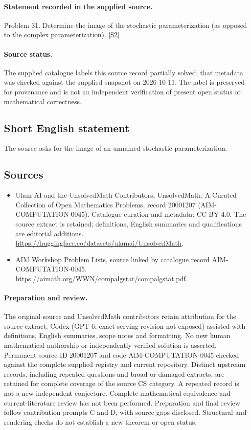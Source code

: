 \documentclass[11pt]{article}
\newcommand{\sref}[2]{\hyperlink{source:#1:#2}{[S#2]}}
\begin{document}
\paragraph{Statement recorded in the supplied source.}
Problem 31. Determine the image of the stochastic parameterization (as opposed to the complex parameterization). \sref{20001207}{2}
\paragraph{Source status.}
The supplied catalogue labels this source record partially solved; that metadata was checked against the supplied snapshot on 2026-10-11. The label is preserved for provenance and is not an independent verification of present open status or mathematical correctness.
\subsection{Short English statement}
The source asks for the image of an unnamed stochastic parameterization.
\subsection{Sources}
\begin{itemize}
\item[\hypertarget{source:20001207:1}{S1}] Ulam AI and the UnsolvedMath Contributors, UnsolvedMath: A Curated Collection of Open Mathematics Problems, record 20001207 (AIM-COMPUTATION-0045). Catalogue curation and metadata: CC BY 4.0. The source extract is retained; definitions, English summaries and qualifications are editorial additions.
\url{https://huggingface.co/datasets/ulamai/UnsolvedMath}.
\item[\hypertarget{source:20001207:2}{S2}] AIM Workshop Problem Lists, source linked by catalogue record AIM-COMPUTATION-0045.
\url{https://aimath.org/WWN/compalgstat/compalgstat.pdf}.
\end{itemize}
\paragraph{Preparation and review.}
The original source and UnsolvedMath contributors retain attribution for the source extract. Codex (GPT-6; exact serving revision not exposed) assisted with definitions, English summaries, scope notes and formatting. No new human mathematical authorship or independently verified solution is asserted. Permanent source ID 20001207 and code AIM-COMPUTATION-0045 checked against the complete supplied registry and current repository. Distinct upstream records, including repeated questions and broad or damaged extracts, are retained for complete coverage of the source CS category. A repeated record is not a new independent conjecture. Complete mathematical-equivalence and current-literature review has not been performed. Preparation and final review follow contribution prompts C and D, with source gaps disclosed. Structural and rendering checks do not establish a new theorem or open status.
\label{end:20001207}
\end{document}
